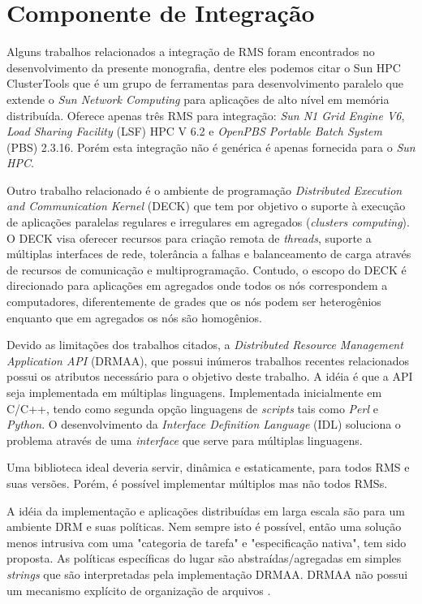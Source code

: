\chapter{Componente de Integração}
\label{cap:drmaa}

Alguns trabalhos relacionados a integração de RMS foram encontrados no desenvolvimento da presente monografia, dentre eles podemos citar o Sun HPC ClusterTools \cite{sunhpc} que é um grupo de ferramentas para desenvolvimento paralelo que extende o \emph{Sun Network Computing} para aplicações de alto nível em memória distribuída. Oferece apenas três RMS para integração: \emph{Sun N1 Grid Engine V6}, \emph{Load Sharing Facility} (LSF) HPC V 6.2 e \emph{OpenPBS Portable Batch System} (PBS) 2.3.16. Porém esta integração não é genérica é apenas fornecida para o \emph{Sun HPC}.

Outro trabalho relacionado é o ambiente de programação \emph{Distributed Execution and Communication Kernel} (DECK) \cite{Barreto2000} que tem por objetivo o suporte à execução de aplicações paralelas regulares e irregulares em agregados (\emph{clusters computing}). O DECK visa oferecer recursos para criação remota de \emph{threads}, suporte a múltiplas interfaces de rede, tolerância a falhas e balanceamento de carga através de recursos de comunicação e multiprogramação. Contudo, o escopo do DECK é direcionado para aplicações em agregados onde todos os nós correspondem a computadores, diferentemente de grades que os nós podem ser heterogênios enquanto que em agregados os nós são homogênios. 

Devido as limitações dos trabalhos citados, a \emph{Distributed Resource Management Application API} (DRMAA), que possui inúmeros trabalhos recentes relacionados \cite{Ciesnik2007, Haas2004, Herrera2007, Templeton2006}  possui os atributos necessário para o objetivo deste trabalho.
A idéia é que a API seja implementada em múltiplas linguagens. Implementada inicialmente em C/C++, tendo como segunda opção linguagens de \emph{scripts} tais como \emph{Perl} e \emph{Python}. O desenvolvimento da \emph{Interface Definition Language} (IDL) soluciona o problema através de uma \emph{interface} que serve para múltiplas linguagens.

Uma biblioteca ideal deveria servir, dinâmica e estaticamente, para todos RMS e suas versões. Porém, é possível implementar múltiplos mas não todos RMSs.

A idéia da implementação e aplicações distribuídas em larga escala são para um ambiente DRM e suas políticas. Nem sempre isto é possível, então uma solução menos intrusiva com uma "categoria de tarefa" e "especificação nativa", tem sido proposta. As políticas específicas do lugar são abstraídas/agregadas em simples \emph{strings} que são interpretadas pela implementação DRMAA. DRMAA não possui um mecanismo explícito de organização de arquivos  \cite{Rajic2004}.

